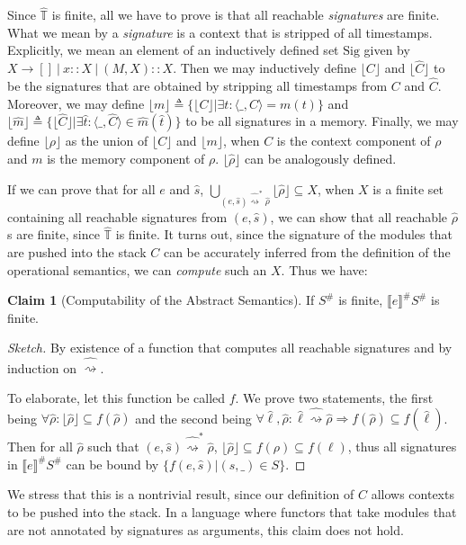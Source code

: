 \documentclass{article}
\theoremstyle{definition}
\newtheorem{clm}{Claim}[section]
\newcommand*{\A}[1]{\widehat{#1}}
\newcommand*{\Abs}[1]{{#1}^{\#}}
\newcommand*{\Time}{\mathbb{T}}
\newcommand*{\ATime}{\A{\Time}}
\newcommand*{\Sig}{\text{Sig}}
\newcommand*{\semarrow}{\rightsquigarrow}
\newcommand*{\asemarrow}{\widehat{\rightsquigarrow}}
\newcommand*{\sembracket}[1]{\lBrack{#1}\rBrack}
\begin{document}
Since $\ATime$ is finite, all we have to prove is that all reachable \emph{signatures} are finite.
What we mean by a \emph{signature} is a context that is stripped of all timestamps.
Explicitly, we mean an element of an inductively defined set $\Sig$ given by $X\rightarrow []\:|\:x::X\:|\:(M,X)::X$.
Then we may inductively define $\lfloor C\rfloor$ and $\lfloor \A{C}\rfloor$ to be the signatures that are obtained by stripping all timestamps from $C$ and $\A{C}$.
Moreover, we may define $\lfloor m\rfloor\triangleq\{\lfloor C\rfloor|\exists t:\langle\_,C\rangle=m(t)\}$ and $\lfloor\A{m}\rfloor\triangleq\{\lfloor\A{C}\rfloor|\exists\A{t}:\langle\_,\A{C}\rangle\in\A{m}(\A{t})\}$ to be all signatures in a memory.
Finally, we may define $\lfloor\rho\rfloor$ as the union of $\lfloor C\rfloor$ and $\lfloor m\rfloor$, when $C$ is the context component of $\rho$ and $m$ is the memory component of $\rho$.
$\lfloor\A\rho\rfloor$ can be analogously defined.

If we can prove that for all $e$ and $\A{s}$, $\bigcup_{(e,\A{s})\A\semarrow^*\A\rho}\lfloor\A\rho\rfloor\subseteq X$, when $X$ is a finite set containing all reachable signatures from $(e,\A{s})$, we can show that all reachable $\A\rho$s are finite, since $\ATime$ is finite.
It turns out, since the signature of the modules that are pushed into the stack $C$ can be accurately inferred from the definition of the operational semantics, we can \emph{compute} such an $X$.
Thus we have:
\begin{clm}[Computability of the Abstract Semantics]
  If $\Abs{S}$ is finite, $\Abs{\sembracket{e}}\Abs{S}$ is finite.
\end{clm}
\begin{proof}[Sketch]
  By existence of a function that computes all reachable signatures and by induction on $\asemarrow$.
  
  To elaborate, let this function be called $f$.
  We prove two statements, the first being $\forall\A\rho:\lfloor\A\rho\rfloor\subseteq f(\A\rho)$ and the second being $\forall\A\ell,\A\rho:\A\ell\A\semarrow\A\rho\Rightarrow f(\A\rho)\subseteq f(\A\ell)$.
  Then for all $\A\rho$ such that $(e,\A{s})\A\semarrow^*\A\rho$, $\lfloor\A\rho\rfloor\subseteq f(\rho)\subseteq f(\ell)$, thus all signatures in $\Abs{\sembracket{e}}\Abs{S}$ can be bound by $\{f(e,\A{s})|(\A{s},\_)\in S\}$.
\end{proof}

We stress that this is a nontrivial result, since our definition of $C$ allows contexts to be pushed into the stack.
In a language where functors that take modules that are not annotated by signatures as arguments, this claim does not hold.
\end{document}
